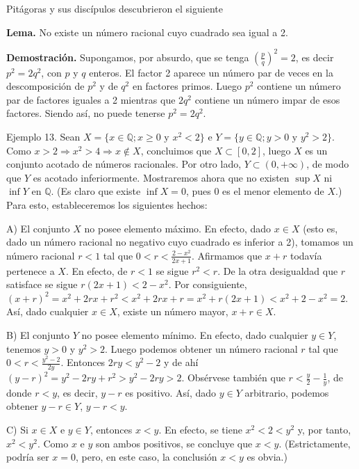 \documentclass[12pt,oneside]{book}
\begin{document}
Pitágoras y sus discípulos descubrieron el siguiente

\textbf{Lema.} No existe un número racional cuyo cuadrado sea igual a 2.

\textbf{Demostración.} Supongamos, por absurdo, que se tenga \( {\left(\frac{p}{q}\right)}^2 = 2 \), es decir \( p^2 = 2q^2 \), con \( p \) y \( q \) enteros. El factor 2 aparece un número par de veces en la descomposición de \( p^2 \) y de \( q^2 \) en factores primos. Luego \( p^2 \) contiene un número par de factores iguales a 2 mientras que \( 2q^2 \) contiene un número impar de esos factores. Siendo así, no puede tenerse \( p^2 = 2q^2 \).

Ejemplo 13. Sean \( X = \{ x \in \mathbb{Q}; x \geq 0 \text{ y } x^2 < 2 \} \) e \( Y = \{ y \in \mathbb{Q}; y > 0 \text{ y } y^2 > 2 \} \). Como \( x > 2 \Rightarrow x^2 > 4 \Rightarrow x \notin X \), concluimos que \( X \subset [0, 2] \), luego \( X \) es un conjunto acotado de números racionales. Por otro lado, \( Y \subset (0, +\infty) \), de modo que \( Y \) es acotado inferiormente. Mostraremos ahora que no existen \( \sup X \) ni \( \inf Y \) en \( \mathbb{Q} \). (Es claro que existe \( \inf X = 0 \), pues 0 es el menor elemento de \( X \).) Para esto, estableceremos los siguientes hechos:

A) El conjunto \( X \) no posee elemento máximo. En efecto, dado \( x \in X \) (esto es, dado un número racional no negativo cuyo cuadrado es inferior a 2), tomamos un número racional \( r < 1 \) tal que \( 0 < r < \frac{2 - x^2}{2x + 1} \). Afirmamos que \( x + r \) todavía pertenece a \( X \). En efecto, de \( r < 1 \) se sigue \( r^2 < r \). De la otra desigualdad que \( r \) satisface se sigue \( r(2x + 1) < 2 - x^2 \). Por consiguiente,  
\( (x + r)^2 = x^2 + 2rx + r^2 < x^2 + 2rx + r = x^2 + r(2x + 1) < x^2 + 2 - x^2 = 2 \).  
Así, dado cualquier \( x \in X \), existe un número mayor, \( x + r \in X \).

B) El conjunto \( Y \) no posee elemento mínimo. En efecto, dado cualquier \( y \in Y \), tenemos \( y > 0 \) y \( y^2 > 2 \). Luego podemos obtener un número racional \( r \) tal que \( 0 < r < \frac{y^2 - 2}{2y} \). Entonces \( 2ry < y^2 - 2 \) y de ahí  
\( (y - r)^2 = y^2 - 2ry + r^2 > y^2 - 2ry > 2 \). Obsérvese también que \( r < \frac{y}{2} - \frac{1}{y} \), de donde \( r < y \), es decir, \( y - r \) es positivo. Así, dado \( y \in Y \) arbitrario, podemos obtener \( y - r \in Y \), \( y - r < y \).

C) Si \( x \in X \) e \( y \in Y \), entonces \( x < y \). En efecto, se tiene \( x^2 < 2 < y^2 \) y, por tanto, \( x^2 < y^2 \). Como \( x \) e \( y \) son ambos positivos, se concluye que \( x < y \). (Estrictamente, podría ser \( x = 0 \), pero, en este caso, la conclusión \( x < y \) es obvia.)
\end{document}
